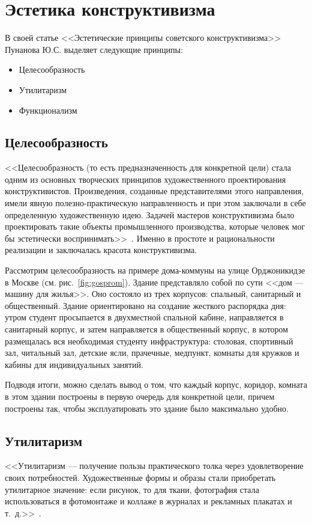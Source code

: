 \chapter{Эстетика конструктивизма}
В своей статье <<Эстетические принципы советского конструктивизма>>~\cite{пунанова2016эстетические} Пунанова Ю.С. выделяет следующие принципы:
\begin{itemize}
    \item Целесообразность
    \item Утилитаризм
    \item Функционализм
\end{itemize}

\section{Целесообразность}
<<Целесообразность (то есть предназначенность для конкретной цели) стала
одним из основных творческих принципов художественного проектирования конструктивистов.
Произведения, созданные представителями этого направления,
имели явную полезно-практическую направленность и при этом заключали в себе определенную художественную
идею. Задачей мастеров конструктивизма было проектировать такие объекты промышленного производства,
которые человек мог бы эстетически воспринимать>>~\cite{пунанова2016эстетические}.
Именно в простоте и рациональности реализации и заключалась красота конструктивизма.

Рассмотрим целесообразность на примере дома-коммуны на улице Орджоникидзе в Москве (см. рис.~\ref{fig:gosprom}).
Здание представляло собой по сути <<дом --- машину для жилья>>.
Оно состояло из трех корпусов: спальный, санитарный и общественный.
Здание ориентировано на создание жесткого распорядка дня:
утром студент просыпается в двухместной спальной кабине,
направляется в санитарный корпус, и затем направляется в общественный корпус, в котором
размещалась вся необходимая студенту инфраструктура: столовая, спортивный зал, читальный зал,
детские ясли, прачечные, медпункт, комнаты для кружков и кабины для индивидуальных занятий.

Подводя итоги, можно сделать вывод о том, что каждый корпус, коридор, комната в этом здании построены в первую очередь для конкретной цели,
причем построены так, чтобы эксплуатировать это здание было максимально удобно.


\section{Утилитаризм}
<<Утилитаризм --- получение пользы практического толка через удовлетворение своих потребностей.
Художественные формы и образы стали приобретать утилитарное значение: если рисунок, то для ткани,
фотография стала использоваться в фотомонтаже и коллаже в журналах и рекламных плакатах и т.~д.>>~\cite{пунанова2016эстетические}.

